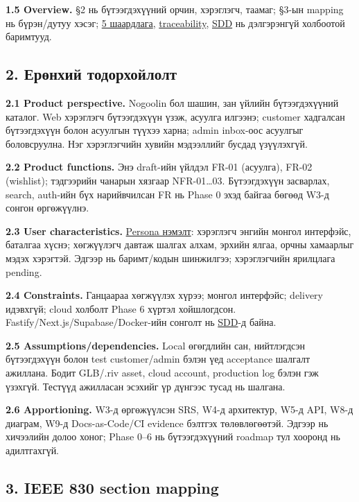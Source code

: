 \documentclass[
  11pt,
  a4paper,
]{article}
\begin{document}
\textbf{1.5 Overview.} §2 нь бүтээгдэхүүний орчин, хэрэглэгч, таамаг;
§3-ын mapping нь бүрэн/дутуу хэсэг;
\href{../../requirements/requirements.md}{5 шаардлага},
\href{../../requirements/traceability-matrix.md}{traceability},
\href{../../architecture/sdd-template.md}{SDD} нь дэлгэрэнгүй холбоотой
баримтууд.

\subsection{2. Ерөнхий
тодорхойлолт}\label{doc3-ux435ux440ux4e9ux43dux445ux438ux439-ux442ux43eux434ux43eux440ux445ux43eux439ux43bux43eux43bux442}

\textbf{2.1 Product perspective.} Nogoolin бол шашин, зан үйлийн
бүтээгдэхүүний каталог. Web хэрэглэгч бүтээгдэхүүн үзэж, асуулга
илгээнэ; customer хадгалсан бүтээгдэхүүн болон асуулгын түүхээ харна;
admin inbox-оос асуулгыг боловсруулна. Нэг хэрэглэгчийн хувийн
мэдээллийг бусдад үзүүлэхгүй.

\textbf{2.2 Product functions.} Энэ draft-ийн үйлдэл FR-01 (асуулга),
FR-02 (wishlist); тэдгээрийн чанарын хязгаар NFR-01\ldots03.
Бүтээгдэхүүн засварлах, search, auth-ийн бүх нарийвчилсан FR нь Phase 0
эхэд байгаа бөгөөд W3-д сонгон өргөжүүлнэ.

\textbf{2.3 User characteristics.}
\href{wiki/persona-and-pivot.md}{Persona нэмэлт}: хэрэглэгч энгийн
монгол интерфэйс, баталгаа хүснэ; хөгжүүлэгч давтаж шалгах алхам, эрхийн
ялгаа, орчны хамаарлыг мэдэх хэрэгтэй. Эдгээр нь баримт/кодын шинжилгээ;
хэрэглэгчийн ярилцлага pending.

\textbf{2.4 Constraints.} Ганцаараа хөгжүүлэх хүрээ; монгол интерфэйс;
delivery идэвхгүй; cloud холболт Phase 6 хүртэл хойшлогдсон.
Fastify/Next.js/Supabase/Docker-ийн сонголт нь
\href{../../architecture/sdd-template.md}{SDD}-д байна.

\textbf{2.5 Assumptions/dependencies.} Local өгөгдлийн сан, нийтлэгдсэн
бүтээгдэхүүн болон test customer/admin бэлэн үед acceptance шалгалт
ажиллана. Бодит GLB/.riv asset, cloud account, production log бэлэн гэж
үзэхгүй. Тестүүд ажилласан эсэхийг үр дүнгээс тусад нь шалгана.

\textbf{2.6 Apportioning.} W3-д өргөжүүлсэн SRS, W4-д архитектур, W5-д
API, W8-д диаграм, W9-д Docs-as-Code/CI evidence бэлтгэх төлөвлөгөөтэй.
Эдгээр нь хичээлийн долоо хоног; Phase 0--6 нь бүтээгдэхүүний roadmap
тул хооронд нь адилтгахгүй.

\subsection{3. IEEE 830 section
mapping}\label{doc3-ieee-830-section-mapping}
\end{document}
